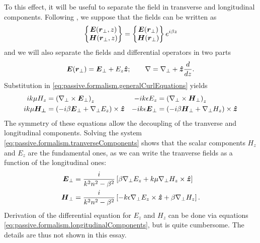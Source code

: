 To this effect, it will be useful to separate the field 
in transverse and longitudinal components. Following \cite{JAC1962,SCH2004b}, 
we suppose that the fields can be written as 
  \begin{equation}
    \begin{Bmatrix}\boldsymbol{E}(\boldsymbol{r}_\perp,z)\\\boldsymbol{H}(\boldsymbol{r}_\perp,z)\end{Bmatrix} = \begin{Bmatrix}\boldsymbol{E}(\boldsymbol{r}_\perp)\\\boldsymbol{H}(\boldsymbol{r}_\perp)\end{Bmatrix}e^{i\beta z}
  \end{equation}
and we will also separate the fields and differential operators in two parts
  \begin{equation}
   \boldsymbol{E}(\boldsymbol{r}_\perp)= \boldsymbol{E}_\perp+E_z\boldsymbol{\hat{z}}; \qquad \nabla=\nabla_\perp + \boldsymbol{\hat{z}}\frac{d}{dz}.
  \end{equation}
Substitution in \eqref{eq:passive.formalism.generalCurlEquations} yields
  \begin{align}
    ik\mu H_z 		&= \left(\nabla_\perp\times\boldsymbol{E}_\perp\right)_z			& -ik\epsilon E_z 		&= \left(\nabla_\perp\times \boldsymbol{H}_\perp\right)_z	\label{eq:passive.formalism.longitudinalComponents}\\
    ik\mu\boldsymbol{H_\perp}	&= \left(-i\beta\boldsymbol{E}_\perp+\nabla_\perp E_z\right)\times\boldsymbol{\hat{z}}	& -ik\epsilon\boldsymbol{E}_\perp 	&= \left(-i\beta\boldsymbol{H}_\perp+\nabla_\perp H_z\right)\times\boldsymbol{\hat{z}} \label{eq:passive.formalism.tranverseComponents}
  \end{align}
The symmetry of these equations allow the decoupling of the tranverse and longitudinal components. 
Solving the system \eqref{eq:passive.formalism.tranverseComponents} 
shows that the scalar components $H_z$ and $E_z$ are the fundamental ones, 
as we can write the tranverse fields as a function of the longitudinal
ones:
  \begin{subequations}
  \begin{align}
    \boldsymbol{E}_\perp	&= \frac{i}{k^2n^2-\beta^2}\left[\beta\nabla_\perp E_z+k\mu\nabla_\perp H_z\times\boldsymbol{\hat{z}}\right]	\\
    \boldsymbol{H}_\perp	&= \frac{i}{k^2n^2-\beta^2}\left[-k\epsilon\nabla_\perp E_z\times\boldsymbol{\hat{z}}+\beta\nabla_\perp H_z\right].
  \end{align}
  \end{subequations}
Derivation of the differential equation for $E_z$ and $H_z$ can be
done via equations \eqref{eq:passive.formalism.longitudinalComponents}, but
is quite cumbersome. The details are thus not shown in this essay.

